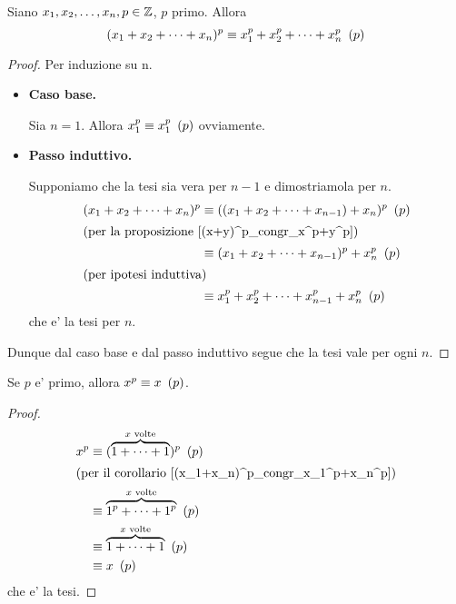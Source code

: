 \begin{corollary}\label{(x_1+x_n)^p_congr_x_1^p+x_n^p}
    Siano $x_1, x_2, \dots, x_n, p \in \mathbb{Z}$, $p$ primo. Allora
    \begin{equation}
        (x_1+x_2+\dots+x_n)^p \equiv x_1^p + x_2^p + \dots + x_n^p \ \left(p\right)
    \end{equation}
\end{corollary}
\begin{proof}
    Per induzione su n.
    \begin{itemize}
        \item \textbf{Caso base.}

        Sia $n = 1$. Allora $x_1^p \equiv x_1^p \ \left(p\right)$ ovviamente.
        \item \textbf{Passo induttivo.}
        
        Supponiamo che la tesi sia vera per $n-1$ e dimostriamola per $n$.
        \begin{alignat*}{1}
            (x_1+x_2+\dots+x_n)^p &\equiv ((x_1+x_2+\dots+x_{n-1})+x_n)^p \ \left(p\right)\\
            \intertext{(per la proposizione \ref{(x+y)^p_congr_x^p+y^p})}
            &\equiv (x_1+x_2+\dots+x_{n-1})^p+x_n^p\ \left(p\right)\\
            \intertext{(per ipotesi induttiva)}
            &\equiv x_1^p + x_2^p + \dots + x_{n-1}^p + x_n^p\ \left(p\right)
        \end{alignat*}
        che e' la tesi per $n$.
    \end{itemize}
    Dunque dal caso base e dal passo induttivo segue che la tesi vale per ogni $n$.
\end{proof}

\begin{theorem}
    Se $p$ e' primo, allora $x^p \equiv x \ \left(p\right)$.
\end{theorem}
\begin{proof}
    \begin{alignat*}{1}
        x^p &\equiv (\overbrace{1 +\dots+ 1}^{x \text{ volte}})^p \ \left(p\right)\\
        \intertext{(per il corollario \ref{(x_1+x_n)^p_congr_x_1^p+x_n^p})}
        &\equiv \overbrace{1^p +\dots+ 1^p}^{x \text{ volte}} \ \left(p\right)\\
        &\equiv \overbrace{1 +\dots+ 1}^{x \text{ volte}} \ \left(p\right)\\
        &\equiv x \ \left(p\right)
    \end{alignat*}
    che e' la tesi.
\end{proof}